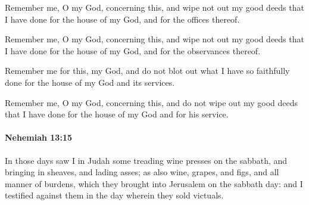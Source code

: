 			Remember me, O my God, concerning this, and wipe not out my good deeds that I have done for the house of my God, and for the offices thereof.

			\begin{versebox}
					\item[BHS] 
					\item[LXX] 
					\item[ASV] Remember me, O my God, concerning this, and wipe not out my good deeds that I have done for the house of my God, and for the observances thereof.
					\item[NIV] Remember me for this, my God, and do not blot out what I have so faithfully done for the house of my God and its services.
					\item[NRSV] Remember me, O my God, concerning this, and do not wipe out my good deeds that I have done for the house of my God and for his service.
			\end{versebox}

		\paragraph{Nehemiah 13:15} %
			\label{NEHEMIAH-13-15}

			In those days saw I in Judah some treading wine presses on the sabbath, and bringing in sheaves, and lading asses; as also wine, grapes, and figs, and all manner of burdens, which they brought into Jerusalem on the sabbath day: and I testified against them in the day wherein they sold victuals.

